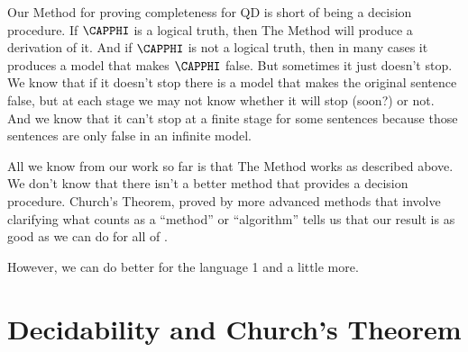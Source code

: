 Our Method for proving completeness for QD is short of being a decision procedure.  If $\CAPPHI$ is a logical truth, then The Method will produce a derivation of it.  And if $\CAPPHI$ is not a logical truth, then in many cases it produces a model that makes $\CAPPHI$ false.  But sometimes it just doesn't stop.  We know that if it doesn't stop there is a model that makes the original sentence false, but at each stage we may not know whether it will stop (soon?) or not.   And we know that it can't stop at a finite stage for some sentences because those sentences are only false in an infinite model.

All we know from our work so far is that The Method works as described above. We don't know that there isn't a better method that provides a decision procedure.  Church's Theorem, proved by more advanced methods that involve clarifying what counts as a ``method'' or ``algorithm'' tells us that our result is as good as we can do for all of \GQL{}.

However, we can do better for the language \GQL{}1 and a little more.

\section{Decidability and Church's Theorem}\label{Decidability and Churchs Theorem}

